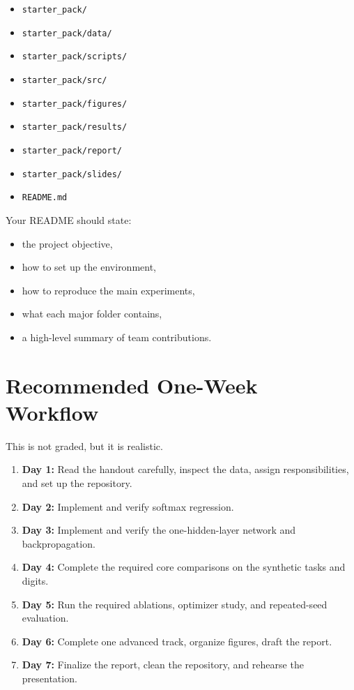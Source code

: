 \documentclass[11pt]{article}
\begin{document}
\begin{itemize}
    \item \verb|starter_pack/|
    \item \verb|starter_pack/data/|
    \item \verb|starter_pack/scripts/|
    \item \verb|starter_pack/src/|
    \item \verb|starter_pack/figures/|
    \item \verb|starter_pack/results/|
    \item \verb|starter_pack/report/|
    \item \verb|starter_pack/slides/|
    \item \verb|README.md|
\end{itemize}

Your README should state:

\begin{itemize}
    \item the project objective,
    \item how to set up the environment,
    \item how to reproduce the main experiments,
    \item what each major folder contains,
    \item a high-level summary of team contributions.
\end{itemize}

\section{Recommended One-Week Workflow}

This is not graded, but it is realistic.

\begin{enumerate}
    \item \textbf{Day 1:} Read the handout carefully, inspect the data, assign responsibilities, and set up the repository.
    \item \textbf{Day 2:} Implement and verify softmax regression.
    \item \textbf{Day 3:} Implement and verify the one-hidden-layer network and backpropagation.
    \item \textbf{Day 4:} Complete the required core comparisons on the synthetic tasks and digits.
    \item \textbf{Day 5:} Run the required ablations, optimizer study, and repeated-seed evaluation.
    \item \textbf{Day 6:} Complete one advanced track, organize figures, draft the report.
    \item \textbf{Day 7:} Finalize the report, clean the repository, and rehearse the presentation.
\end{enumerate}
\end{document}
